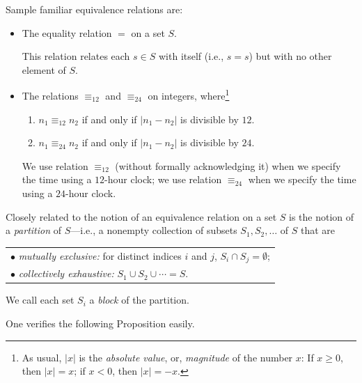 \noindent
Sample familiar  equivalence relations are:
\begin{itemize}
\item
The equality relation $=$ on a set $S$.

\smallskip

This relation relates each $s \in S$ with itself (i.e., $s=s$) but with no other element of $S$.

\item
The relations $\equiv_{12}$ and $\equiv_{24}$ on integers, where\footnote{As usual, $|x|$ is the {\em absolute value}, or, {\em magnitude} of the number $x$: If $x \geq 0$, then $|x| = x$; if $x < 0$, then $|x| = -x$.}
  \begin{enumerate}
  \item
$n_1 \equiv_{12} n_2$ if and only if $|n_1 - n_2|$ is divisible by $12$.
  \item
$n_1 \equiv_{24} n_2$ if and only if $|n_1 - n_2|$ is divisible by $24$.
  \end{enumerate}

\smallskip

We use relation $\equiv_{12}$ (without formally acknowledging it) when we specify the time using a $12$-hour clock; we use relation $\equiv_{24}$ when we specify the time using a $24$-hour clock.
\end{itemize}

\smallskip

 

\noindent
Closely related to the notion of an equivalence relation on a set $S$ is the notion of a {\it partition} of $S$---i.e., a nonempty collection of subsets $S_1, S_2, \ldots$ of $S$ that are

\smallskip

\begin{tabular}{l}
$\bullet$ {\em mutually exclusive:}
for distinct indices $i$ and $j$, $S_i \cap S_j = \emptyset$; \\
$\bullet$ {\em collectively exhaustive:}
$S_1 \cup S_2 \cup \cdots = S$.
\end{tabular}

\smallskip

\noindent
We call each set $S_i$ a {\it block} of the partition. 
 

\noindent
One verifies the following Proposition easily.

